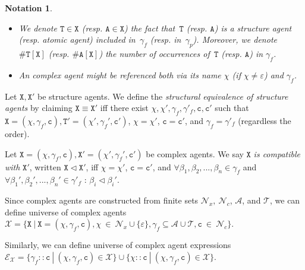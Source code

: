 \documentclass{entcs}
\renewcommand{\~}[0]{\texttildelow}
\newtheorem{notation}[thm]{Notation}
\begin{document}
\begin{notation}
~
\begin{itemize}
\item  We denote $\mathtt{T}\in \mathtt{X}$ (resp. $\mathtt{A}\in \mathtt{X}$) the fact that~$\mathtt{T}$ (resp. $\mathtt{A}$) is a structure agent (resp. atomic agent) included in~$\gamma_f$ (resp. in~$\gamma_p$). 
Moreover, we denote $\#\mathtt{T}[\mathtt{X}]$ (resp. $\#\mathtt{A}[\mathtt{X}]$) the number of occurrences of~$\mathtt{T}$ (resp. $\mathtt{A}$) in $\gamma_f$. 
\item An complex agent might be referenced both via its name $\chi$ (if $\chi \neq \varepsilon$) and $\gamma_f$.
\end{itemize}
\end{notation}

\begin{defn}
Let $\mathtt{X},\mathtt{X}'$ be structure agents. We define the \emph{structural equivalence of structure agents} by claiming $\mathtt{X} \equiv \mathtt{X}'$ iff there exist $\chi,\chi',\gamma_f,\gamma'_f, \mathtt{c},\mathtt{c}'$ such that $\mathtt{X}=(\chi, \gamma_f, \mathtt{c}),\mathtt{T}'=(\chi', \gamma_f', \mathtt{c}')$, $\chi=\chi'$, $\mathtt{c} = \mathtt{c}'$, and $\gamma_f=\gamma'_f$ (regardless the order).
\end{defn}

\begin{defn}
Let $\mathtt{X} = (\chi, \gamma_f, \mathtt{c}), \mathtt{X}' = (\chi', \gamma_f', \mathtt{c}')$ be complex agents. We say $\mathtt{X}$ \emph{is compatible with} $\mathtt{X}'$, written $\mathtt{X} \lhd \mathtt{X}'$, iff $\chi=\chi'$, $\mathtt{c} = \mathtt{c}'$, and $\forall \beta_1, \beta_2, ..., \beta_n \in \gamma_f $ and $\forall \beta_1', \beta_2', ..., \beta_n' \in \gamma'_f$ : $\beta_i \lhd \beta_i'$. 
\end{defn}

\begin{theorem}
Since complex agents are constructed from finite sets $\mathcal{N}_{x},~\mathcal{N}_{c}$, $\mathcal{A}$, and $\mathcal{T}$, we can define universe of complex agents $\mathcal{X} = \{ \mathtt{X}~|~\mathtt{X} = (\chi, \gamma_f, \mathtt{c}), \chi~\in~\mathcal{N}_{x} \cup \{\varepsilon\}, \gamma_f \subseteq \mathcal{A} \cup \mathcal{T},  \mathtt{c}~\in~\mathcal{N}_{c} \}$.

\noindent Similarly, we can define universe of complex agent expressions\\ $\mathcal{E}_\mathcal{X} = \{ \gamma_f::\mathtt{c} ~|~ (\chi, \gamma_f, \mathtt{c}) \in \mathcal{X} \} \cup \{ \chi::\mathtt{c} ~|~ (\chi, \gamma_f, \mathtt{c}) \in \mathcal{X} \}$.
\end{theorem}
\end{document}
